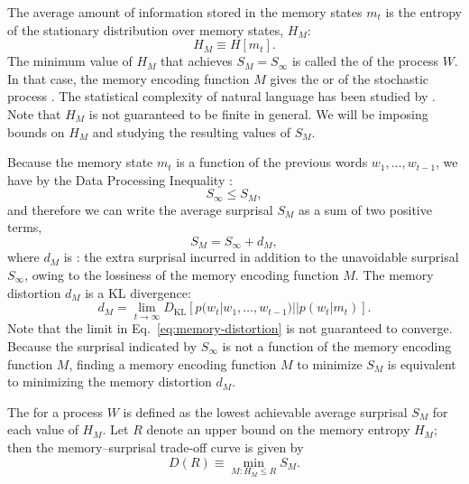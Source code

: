 The average amount of information stored in the memory states $m_t$ is the entropy of the stationary distribution over memory states, $H_M$:
\begin{equation}
    \label{eq:memory-entropy}
    H_M \equiv H[m_t].
\end{equation}
The minimum value of $H_M$ that achieves $S_M = S_\infty$ is called the  of the process $W$. In that case, the memory encoding function $M$ gives the  or  of the stochastic process \citep{feldman-measures-1998}. The statistical complexity of natural language has been studied by \citet{hahn2019neural}. Note that $H_M$ is not guaranteed to be finite in general. We will be imposing bounds on $H_M$ and studying the resulting values of $S_M$. 

Because the memory state $m_t$ is a function of the previous words $w_1, \dots, w_{t-1}$, we have by the Data Processing Inequality \citep[][pp. 34--35]{cover2006elements}:
\begin{equation}
    S_\infty \le S_M,
\end{equation}
and therefore we can write the average surprisal $S_M$ as a sum of two positive terms,
\begin{equation}
    S_M = S_\infty + d_M,
\end{equation}
where $d_M$ is : the extra surprisal incurred in addition to the unavoidable surprisal $S_\infty$, owing to the lossiness of the memory encoding function $M$. 
The memory distortion $d_M$ is a KL divergence:
\begin{equation}
    \label{eq:memory-distortion}
    d_M = \lim_{t \rightarrow \infty} D_{\text{KL}} [ p(w_t | w_1, \dots, w_{t-1}) || p(w_t | m_t)].
\end{equation}
Note that the limit in Eq.~\ref{eq:memory-distortion} is not guaranteed to converge. 
Because the surprisal indicated by $S_\infty$ is not a function of the memory encoding function $M$, finding a memory encoding function $M$ to minimize $S_M$ is equivalent to minimizing the memory distortion $d_M$.

The  for a process $W$ is defined as the lowest achievable average surprisal $S_M$ for each value of $H_M$. Let $R$ denote an upper bound on the memory entropy $H_M$; then the memory--surprisal trade-off curve is given by
\begin{equation}
    \label{eq:ms-formal}
    D(R) \equiv \min_{M : H_M \le R} S_M.
\end{equation}

